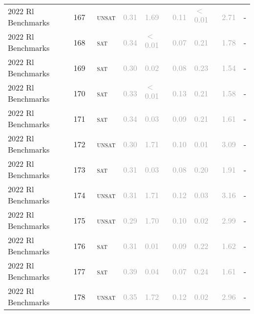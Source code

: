\begin{center}
{\begin{longtable}{@{}lllllllll@{}}
2022 Rl Benchmarks & 167 & ~\textsc{unsat} & \textcolor{darkgray}{0.31} & \textcolor{darkgray}{1.69} & \textcolor{darkgray}{0.11} & \textcolor{darkgray}{$<$0.01} & \textcolor{darkgray}{2.71} & - \\
2022 Rl Benchmarks & 168 & ~\textsc{sat} & \textcolor{darkgray}{0.34} & \textcolor{darkgray}{$<$0.01} & \textcolor{darkgray}{0.07} & \textcolor{darkgray}{0.21} & \textcolor{darkgray}{1.78} & - \\
2022 Rl Benchmarks & 169 & ~\textsc{sat} & \textcolor{darkgray}{0.30} & \textcolor{darkgray}{0.02} & \textcolor{darkgray}{0.08} & \textcolor{darkgray}{0.23} & \textcolor{darkgray}{1.54} & - \\
2022 Rl Benchmarks & 170 & ~\textsc{sat} & \textcolor{darkgray}{0.33} & \textcolor{darkgray}{$<$0.01} & \textcolor{darkgray}{0.13} & \textcolor{darkgray}{0.21} & \textcolor{darkgray}{1.58} & - \\
2022 Rl Benchmarks & 171 & ~\textsc{sat} & \textcolor{darkgray}{0.34} & \textcolor{darkgray}{0.03} & \textcolor{darkgray}{0.09} & \textcolor{darkgray}{0.21} & \textcolor{darkgray}{1.61} & - \\
2022 Rl Benchmarks & 172 & ~\textsc{unsat} & \textcolor{darkgray}{0.30} & \textcolor{darkgray}{1.71} & \textcolor{darkgray}{0.10} & \textcolor{darkgray}{0.01} & \textcolor{darkgray}{3.09} & - \\
2022 Rl Benchmarks & 173 & ~\textsc{sat} & \textcolor{darkgray}{0.31} & \textcolor{darkgray}{0.03} & \textcolor{darkgray}{0.08} & \textcolor{darkgray}{0.20} & \textcolor{darkgray}{1.91} & - \\
2022 Rl Benchmarks & 174 & ~\textsc{unsat} & \textcolor{darkgray}{0.31} & \textcolor{darkgray}{1.71} & \textcolor{darkgray}{0.12} & \textcolor{darkgray}{0.03} & \textcolor{darkgray}{3.16} & - \\
2022 Rl Benchmarks & 175 & ~\textsc{unsat} & \textcolor{darkgray}{0.29} & \textcolor{darkgray}{1.70} & \textcolor{darkgray}{0.10} & \textcolor{darkgray}{0.02} & \textcolor{darkgray}{2.99} & - \\
2022 Rl Benchmarks & 176 & ~\textsc{sat} & \textcolor{darkgray}{0.31} & \textcolor{darkgray}{0.01} & \textcolor{darkgray}{0.09} & \textcolor{darkgray}{0.22} & \textcolor{darkgray}{1.62} & - \\
2022 Rl Benchmarks & 177 & ~\textsc{sat} & \textcolor{darkgray}{0.39} & \textcolor{darkgray}{0.04} & \textcolor{darkgray}{0.07} & \textcolor{darkgray}{0.24} & \textcolor{darkgray}{1.61} & - \\
2022 Rl Benchmarks & 178 & ~\textsc{unsat} & \textcolor{darkgray}{0.35} & \textcolor{darkgray}{1.72} & \textcolor{darkgray}{0.12} & \textcolor{darkgray}{0.02} & \textcolor{darkgray}{2.96} & - \\

\end{longtable}}
\end{center}
